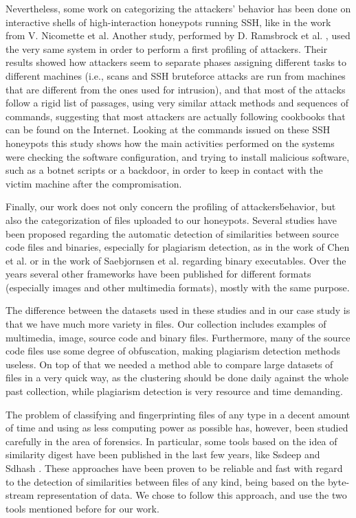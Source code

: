 Nevertheless, some work on categorizing the attackers' behavior has been done on interactive shells of high-interaction honeypots running SSH, like in the work from V. Nicomette et al\cite{highhoney}. Another study, performed by D. Ramsbrock et al. \cite{sshprofiling}, used the very same system in order to perform a first profiling of attackers. Their results showed how attackers seem to  separate phases assigning different tasks to different machines (i.e., scans and SSH bruteforce attacks are run from machines that are different from the ones used for intrusion), and that most of the attacks follow a rigid list of passages, using very similar attack methods and sequences of commands, suggesting that most attackers are actually following cookbooks that can be found on the Internet. Looking at the commands issued on these SSH honeypots this study shows how the main activities performed on the systems were checking the software configuration, and trying to install malicious software, such as a botnet scripts or a backdoor, in order to keep in contact with the victim machine after the compromisation.

Finally, our work does not only concern the profiling of attackers\' behavior, but also the categorization of files uploaded to our honeypots. Several studies have been proposed regarding the automatic detection of similarities between source code files and binaries, especially for plagiarism detection, as in the work of Chen et al. \cite{plagdet1} or in the work of Saebjornsen et al. \cite{plagdet2} regarding binary executables. Over the years several other frameworks have been published for different formats (especially images and other multimedia formats), mostly with the same purpose.

The difference between the datasets used in these studies and in our case study is that we have much more variety in files. Our collection includes examples of multimedia, image, source code and binary files. Furthermore, many of the source code files use some degree of obfuscation, making plagiarism detection methods useless. On top of that we needed a method able to compare large datasets of files in a very quick way, as the clustering should be done daily against the whole past collection, while plagiarism detection is very resource and time demanding.

The problem of classifying and fingerprinting files of any type in a decent amount of time and using as less computing power as possible has, however, been studied carefully in the area of forensics. In particular, some tools based on the idea of similarity digest have been published in the last few years, like Ssdeep \cite{ssdeep} and Sdhash \cite{sdhash}. These approaches have been proven to be reliable and fast with regard to the detection of similarities between files of any kind, being based on the byte-stream representation of data. We chose to follow this approach, and use the two tools mentioned before for our work.
